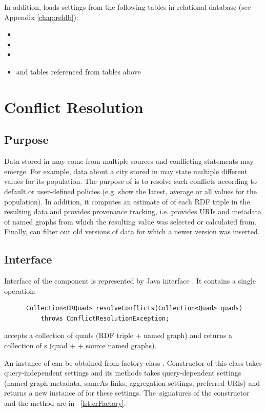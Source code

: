 In addition, \QE loads settings from the following tables in relational database (see Appendix \ref{chap:reldb}):

\begin{itemize}
	\item {}
	\item {} 
	\item {} 
	\item and tables referenced from tables above
\end{itemize}

\chapter{Conflict Resolution}
\label{sec:CR}

\section{Purpose}
Data stored in \odcs may come from multiple sources and conflicting statements may emerge. For example, data about a city stored in \odcs may state multiple different values for its population. The purpose of \CR is to resolve such conflicts according to default or user-defined policies (e.g. show the latest, average or all values for the population). In addition, it computes an estimate of \aggrq of each RDF triple in the resulting data and provides provenance tracking, 	i.e. provides URIs and metadata of named graphs from which the resulting value was selected or calculated from. Finally, \CR can filter out old versions of data for which a newer version was inserted.

\todo{}

\section{Interface}
Interface of the \CR component is represented by Java interface . It contains a single operation:
\begin{verbatim}
      Collection<CRQuad> resolveConflicts(Collection<Quad> quads)
          throws ConflictResolutionException;
\end{verbatim}
\CR accepts a collection of quads (RDF triple + named graph) and returns a collection of s (quad + \aggrq + source named graphs).

An instance of  can be obtained from factory class . Constructor of this class takes query-independent settings and its  methods takes query-dependent settings (named graph metadata, sameAs links, aggregation settings, preferred URIs) and returns a new instance of  for these settings. The~signatures of the constructor and the  method are in \lstlistingname~\ref{lst:crFactory}.

